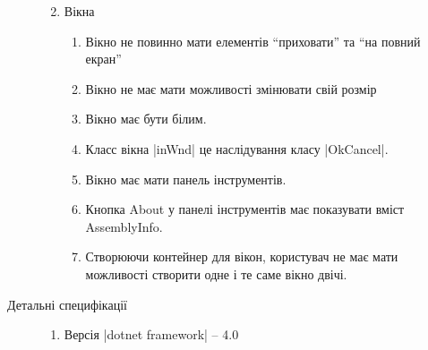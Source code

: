 \begin{description}
\begin{enumerate}
\begin{enumerate}
				\end{enumerate}
			\item Вікна
				\begin{enumerate}
					\item Вікно не повинно мати елементів \enquote{приховати} та \enquote{на повний екран}
					\item Вікно не має мати можливості змінювати свій розмір
					\item Вікно має бути білим.
					\item Класс вікна \textinline|inWnd| це наслідування класу \textinline|OkCancel|.
					\item Вікно має мати панель інструментів.
					\item Кнопка About у панелі інструментів має показувати вміст AssemblyInfo.
					\item Створюючи контейнер для вікон, користувач не має мати можливості створити
						одне і те саме вікно двічі.
				\end{enumerate}
		\end{enumerate}
	\item[Детальні специфікації]\directenv%
		\begin{enumerate}
			\item Версія \textinline|dotnet framework| -- 4.0
		\end{enumerate}
\end{description}
